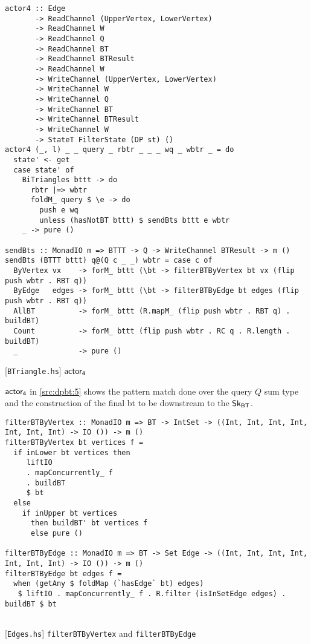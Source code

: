 \begin{listing}[htp!]
\begin{verbatim}            
actor4 :: Edge
       -> ReadChannel (UpperVertex, LowerVertex)
       -> ReadChannel W
       -> ReadChannel Q
       -> ReadChannel BT
       -> ReadChannel BTResult
       -> ReadChannel W
       -> WriteChannel (UpperVertex, LowerVertex)
       -> WriteChannel W
       -> WriteChannel Q
       -> WriteChannel BT
       -> WriteChannel BTResult
       -> WriteChannel W
       -> StateT FilterState (DP st) ()
actor4 (_, l) _ _ query _ rbtr _ _ _ wq _ wbtr _ = do
  state' <- get
  case state' of
    BiTriangles bttt -> do
      rbtr |=> wbtr
      foldM_ query $ \e -> do
        push e wq
        unless (hasNotBT bttt) $ sendBts bttt e wbtr
    _ -> pure ()

sendBts :: MonadIO m => BTTT -> Q -> WriteChannel BTResult -> m ()
sendBts (BTTT bttt) q@(Q c _ _) wbtr = case c of
  ByVertex vx    -> forM_ bttt (\bt -> filterBTByVertex bt vx (flip push wbtr . RBT q))
  ByEdge   edges -> forM_ bttt (\bt -> filterBTByEdge bt edges (flip push wbtr . RBT q))
  AllBT          -> forM_ bttt (R.mapM_ (flip push wbtr . RBT q) . buildBT)
  Count          -> forM_ bttt (flip push wbtr . RC q . R.length . buildBT)
  _              -> pure ()
\end{verbatim}
\caption{[\texttt{BTriangle.hs}] $\ad$}
\label{src:dpbt:5}
\end{listing}

$\mathsf{actor_4}$ in \autoref{src:dpbt:5} shows the pattern match done over the query $Q$ sum type and the construction
of the final \acrshort{bt} to be downstream to the $\mathsf{Sk_{BT}}$. 

\begin{listing}[htp!]
\begin{verbatim}            
filterBTByVertex :: MonadIO m => BT -> IntSet -> ((Int, Int, Int, Int, Int, Int, Int) -> IO ()) -> m ()
filterBTByVertex bt vertices f =
  if inLower bt vertices then
     liftIO
     . mapConcurrently_ f
     . buildBT
     $ bt
  else 
    if inUpper bt vertices 
      then buildBT' bt vertices f
      else pure ()

filterBTByEdge :: MonadIO m => BT -> Set Edge -> ((Int, Int, Int, Int, Int, Int, Int) -> IO ()) -> m ()
filterBTByEdge bt edges f =
  when (getAny $ foldMap (`hasEdge` bt) edges)
   $ liftIO . mapConcurrently_ f . R.filter (isInSetEdge edges) . buildBT $ bt
      
\end{verbatim}
\caption{[\texttt{Edges.hs}] \texttt{filterBTByVertex} and \texttt{filterBTByEdge}}
\label{src:dpbt:6}
\end{listing}
      
